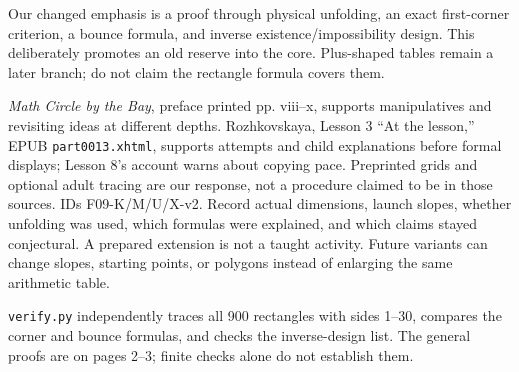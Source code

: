 \documentclass[11pt]{article}
\begin{document}
Our changed emphasis is a proof through physical unfolding, an exact first-corner criterion, a bounce formula, and inverse existence/impossibility design. This deliberately promotes an old reserve into the core. Plus-shaped tables remain a later branch; do not claim the rectangle formula covers them.

\emph{Math Circle by the Bay}, preface printed pp. viii--x, supports manipulatives and revisiting ideas at different depths. Rozhkovskaya, Lesson 3 ``At the lesson,'' EPUB \texttt{part0013.xhtml}, supports attempts and child explanations before formal displays; Lesson 8's account warns about copying pace. Preprinted grids and optional adult tracing are our response, not a procedure claimed to be in those sources.
IDs F09-K/M/U/X-v2. Record actual dimensions, launch slopes, whether unfolding was used, which formulas were explained, and which claims stayed conjectural. A prepared extension is not a taught activity. Future variants can change slopes, starting points, or polygons instead of enlarging the same arithmetic table.

\texttt{verify.py} independently traces all 900 rectangles with sides 1--30, compares the corner and bounce formulas, and checks the inverse-design list. The general proofs are on pages 2--3; finite checks alone do not establish them.
\end{document}
